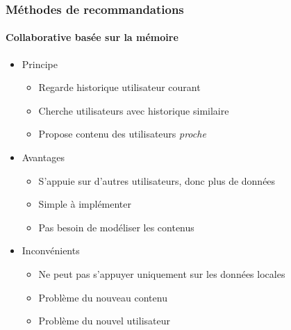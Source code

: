 \documentclass[11pt,sans]{beamer}
\begin{document}
    \begin{frame}
        \frametitle{M\'ethodes de recommandations}
        \framesubtitle{Collaborative bas\'ee sur la m\'emoire}

        \begin{itemize}
            \item Principe
                \begin{itemize}
                    \item Regarde historique utilisateur courant
                    \item Cherche utilisateurs avec historique similaire
                    \item Propose contenu des utilisateurs \emph{proche}
                \end{itemize}
            \item Avantages
                \begin{itemize}
                    \item S'appuie sur d'autres utilisateurs, donc plus
                        de donn\'ees
                    \item Simple à impl\'ementer
                    \item Pas besoin de mod\'eliser les contenus
                \end{itemize}
            \item Inconv\'enients
                \begin{itemize}
                    \item Ne peut pas s'appuyer uniquement sur les donn\'ees
                        locales
                    \item Problème du nouveau contenu
                    \item Problème du nouvel utilisateur
                \end{itemize}
        \end{itemize}
    \end{frame}
\end{document}
